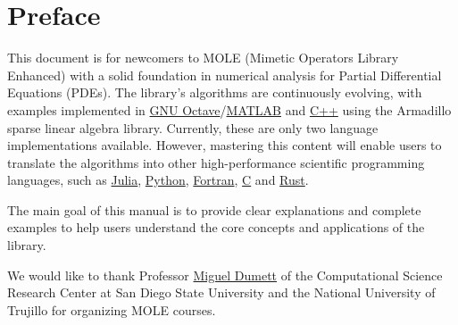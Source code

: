 \chapter{Preface}

This document is for newcomers to MOLE (Mimetic Operators
Library Enhanced) with a solid foundation in numerical analysis for
Partial Differential Equations (PDEs).
The library's algorithms are continuously evolving, with examples
implemented in
\href{https://octave.org}{GNU Octave}/\href{https://www.mathworks.com/products/matlab.html}{MATLAB}
and \href{https://isocpp.org}{C++} using the Armadillo sparse linear
algebra library.
Currently, these are only two language implementations available.
However, mastering this content will enable users to translate the
algorithms into other high-performance
scientific programming languages, such as
\href{https://julialang.org}{Julia},
\href{https://www.python.org}{Python},
\href{https://fortran-lang.org}{Fortran},
\href{https://www.open-std.org/jtc1/sc22/wg14}{C} and
\href{https://www.rust-lang.org}{Rust}.

The main goal of this manual is to provide clear explanations and
complete examples to help users understand the core
concepts and applications of the library.

We would like to thank Professor
\href{https://ctivitae.concytec.gob.pe/appDirectorioCTI/VerDatosInvestigador.do?id_investigador=45848}{Miguel Dumett}
of the Computational Science Research Center at San Diego State
University and the National University of Trujillo for organizing
MOLE courses.

